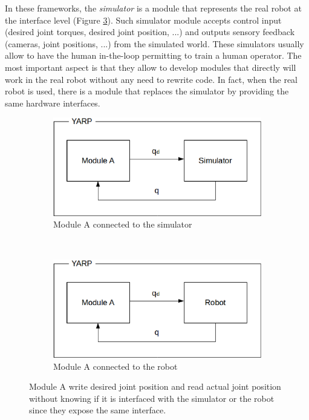 In these frameworks, the \emph{simulator} is a module that represents the real robot at the interface level (Figure \ref{yarp_simulation}). Such simulator module accepts control input (desired joint torques, desired joint position, ...) and outputs sensory feedback (cameras, joint positions, ...) from the simulated world. These simulators usually allow to have the human in-the-loop permitting to train a human operator. The most important aspect is that they allow to develop modules that directly will work in the real robot without any need to rewrite code. In fact, when the real robot is used, there is a module that replaces the simulator by providing the same hardware interfaces. 

\begin{figure}
        \centering
        \begin{subfigure}[b]{0.45\textwidth}
                \includegraphics[width=\textwidth]{images/yarp_simulation_a.eps}
                \caption{Module A connected to the simulator}
                \label{yarp_simulation_a}
        \end{subfigure}%
        \\
        \begin{subfigure}[b]{0.45\textwidth}
                \includegraphics[width=\textwidth]{images/yarp_simulation_b.eps}
                \caption{Module A connected to the robot}
                \label{yarp_simulation_b}
        \end{subfigure}
        \caption{Module A write desired joint position and read actual joint position without knowing if it is interfaced with the simulator or the robot since they expose the same interface.}\label{yarp_simulation}
\end{figure}


